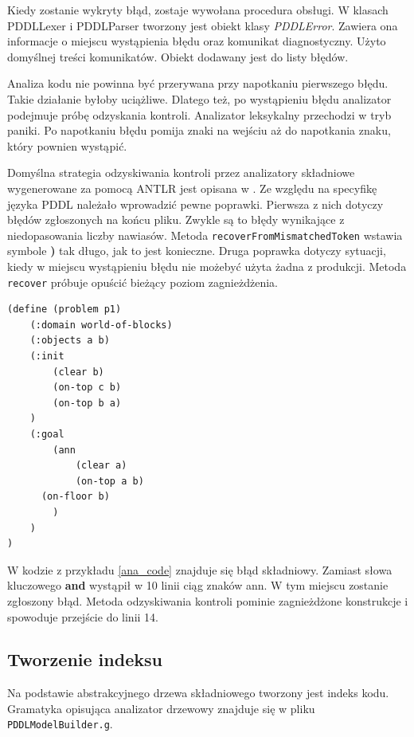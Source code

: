 Kiedy zostanie wykryty błąd, zostaje wywołana procedura obsługi. W klasach 
PDDLLexer i PDDLParser tworzony jest obiekt klasy \emph{PDDLError}. Zawiera
ona informacje o miejscu wystąpienia błędu oraz komunikat diagnostyczny. Użyto
domyślnej treści komunikatów. Obiekt dodawany jest do listy błędów. 

Analiza kodu nie powinna być przerywana przy napotkaniu pierwszego błędu. Takie
działanie byłoby uciążliwe. Dlatego też, po wystąpieniu błędu analizator podejmuje
próbę odzyskania kontroli. Analizator leksykalny przechodzi w tryb paniki. Po napotkaniu 
błędu pomija znaki na wejściu aż do napotkania znaku, który pownien wystąpić.

Domyślna strategia odzyskiwania kontroli przez analizatory składniowe wygenerowane 
za pomocą ANTLR jest opisana w \cite{antlr}. Ze względu na specyfikę języka PDDL
należało wprowadzić pewne poprawki. Pierwsza z nich dotyczy błędów zgłoszonych na końcu pliku.
Zwykle są to błędy wynikające z niedopasowania liczby nawiasów.
Metoda \texttt{recoverFromMismatchedToken} wstawia symbole \textbf{)} tak długo, jak to jest konieczne.
Druga poprawka dotyczy sytuacji, kiedy w miejscu wystąpieniu błędu nie możebyć użyta żadna
z produkcji. Metoda \texttt{recover} próbuje opuścić bieżący poziom zagnieżdżenia.

\begin{Code}
\begin{lstlisting}[language=LISP,frame=single,label=ana_code, caption=Kod PDDL zawierający błąd składniowy]
(define (problem p1)
	(:domain world-of-blocks)
	(:objects a b)
	(:init
		(clear b)
		(on-top c b)
		(on-top b a)
	)
	(:goal
		(ann
			(clear a)
			(on-top a b)
      (on-floor b)
		)
	)
)
\end{lstlisting}
\end{Code}

W kodzie z przykładu \ref{ana_code} znajduje się błąd składniowy. Zamiast słowa kluczowego \textbf{and}
wystąpił w 10 linii ciąg znaków ann. W tym miejscu zostanie zgłoszony błąd. Metoda odzyskiwania kontroli
pominie zagnieżdżone konstrukcje i spowoduje przejście do linii 14.

\subsection{Tworzenie indeksu}
\label{subsec:indeks}
Na podstawie abstrakcyjnego drzewa składniowego tworzony jest indeks kodu. 
Gramatyka opisująca analizator drzewowy znajduje się w pliku \texttt{PDDLModelBuilder.g}.


